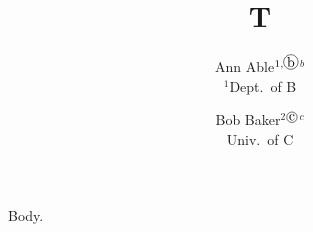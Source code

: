 \documentclass{article}
\title{T}
\author{Ann Able$^{1,\circled{b}}$$^{b}$\footremember{zz}{Zebra University.} \\ $^{1}$Dept.\ of B \and Bob Baker$^{2}$$^{\circled{c}}$$^{c}$ \\ Univ.\ of C}
\begin{document}
\maketitle
Body.
\end{document}
